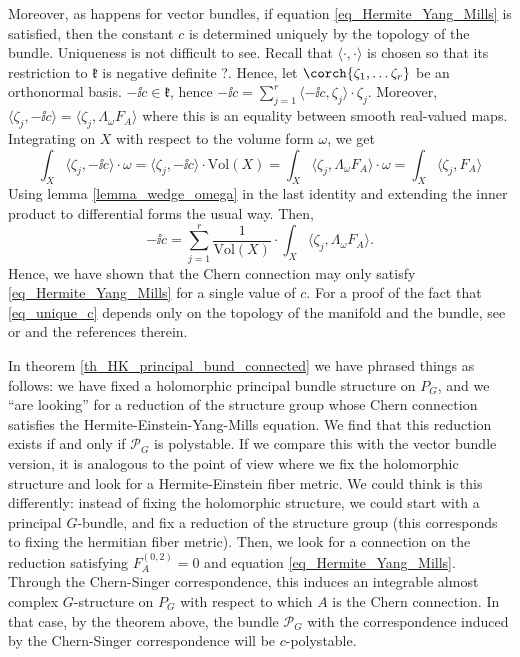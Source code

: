 {\begin{obs}
    Moreover, as happens for vector bundles, if equation \eqref{eq_Hermite_Yang_Mills} is satisfied, then the constant \(c\) is determined uniquely by the topology of the bundle. Uniqueness is not difficult to see. Recall that \(\langle \cdot, \cdot \rangle\) is chosen so that its restriction to \(\mathfrak{k}\) is negative definite {\color{red}?}. Hence, let \(\corch{\zeta_1, \ldots \zeta_r}\) be an orthonormal basis. \(-\ii c \in \mathfrak{k}\), hence \(-\ii c=\sum_{j=1}^r \langle-\ii c,\zeta_j\rangle \cdot \zeta_j \). Moreover, \(\langle \zeta_j, -\ii c \rangle=\langle\zeta_j, \Lambda_\omega F_A \rangle\) where this is an equality between smooth real-valued maps. Integrating on \(X\) with respect to the volume form \(\omega\), we get
    \[
    \int_X\langle\zeta_j, -\ii c\rangle \cdot \omega = \langle \zeta_j, -\ii c \rangle \cdot \mathrm{Vol}(X)=\int_X \langle \zeta_j , \Lambda_\omega F_A \rangle \cdot \omega = \int_X \langle \zeta_j, F_A \rangle  
    \]
    Using lemma \ref{lemma_wedge_omega} in the last identity and extending the inner product to differential forms the usual way. Then,
    \begin{equation} \label{eq_unique_c}
    -\ii c = \sum_{j=1}^r \frac{1}{\mathrm{Vol}(X)} \cdot \int_X \langle \zeta_j, \Lambda_\omega F_A \rangle.
    \end{equation}
    Hence, we have shown that the Chern connection may only satisfy \eqref{eq_Hermite_Yang_Mills} for a single value of \(c\). For a proof of the fact that \ref{eq_unique_c} depends only on the topology of the manifold and the bundle, see \parencite[Prop. 3.4]{garcia2014connectedness} or \parencite[Remark 1.2]{alvarez2013coupled} and the references therein. 
\end{obs}

In theorem \ref{th_HK_principal_bund_connected} we have phrased things as follows: we have fixed a holomorphic principal bundle structure on \(P_G\), and we ``are looking'' for a reduction of the structure group whose Chern connection satisfies the Hermite-Einstein-Yang-Mills equation. We find that this reduction exists if and only if \(\mathcal{P}_G\) is polystable. If we compare this with the vector bundle version, it is analogous to the point of view where we fix the holomorphic structure and look for a Hermite-Einstein fiber metric. We could think is this differently: instead of fixing the holomorphic structure, we could start with a principal \(G\)-bundle, and fix a reduction of the structure group (this corresponds to fixing the hermitian fiber metric). Then, we look for a connection on the reduction satisfying \(F_A^{(0,2)}=0\) and equation \ref{eq_Hermite_Yang_Mills}. Through the Chern-Singer correspondence, this induces an integrable almost complex \(G\)-structure on \(P_G\) with respect to which \(A\) is the Chern connection. In that case, by the theorem above, the bundle \(\mathcal{P}_G\) with the correspondence induced by the Chern-Singer correspondence will be \(c\)-polystable.

}
